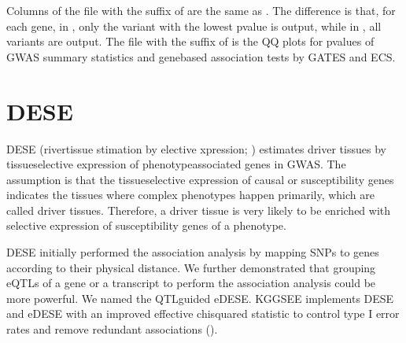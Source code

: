 \documentclass[letterpaper,10pt,english,openany,oneside]{sphinxmanual}
\begin{document}
\sphinxAtStartPar
Columns of the file with the suffix of  are the same as . The difference is that, for each gene, in , only the variant with the lowest p\sphinxhyphen{}value is output, while in , all variants are output. The file with the suffix of  is the Q\sphinxhyphen{}Q plots for p\sphinxhyphen{}values of GWAS summary statistics and gene\sphinxhyphen{}based association tests by GATES and ECS.


\section{DESE}
\label{\detokenize{detailed_document:dese}}\label{\detokenize{detailed_document:detail-dese}}
\sphinxAtStartPar
DESE (river\sphinxhyphen{}tissue stimation by elective xpression; ) estimates driver tissues by tissue\sphinxhyphen{}selective expression of phenotype\sphinxhyphen{}associated genes in GWAS. The assumption is that the tissue\sphinxhyphen{}selective expression of causal or susceptibility genes indicates the tissues where complex phenotypes happen primarily, which are called driver tissues. Therefore, a driver tissue is very likely to be enriched with selective expression of susceptibility genes of a phenotype.

\sphinxAtStartPar
DESE initially performed the association analysis by mapping SNPs to genes according to their physical distance. We further demonstrated that grouping eQTLs of a gene or a transcript to perform the association analysis could be more powerful. We named the QTL\sphinxhyphen{}guided  eDESE. KGGSEE implements DESE and eDESE with an improved effective chi\sphinxhyphen{}squared statistic to control type I error rates and remove redundant associations ().
\end{document}
